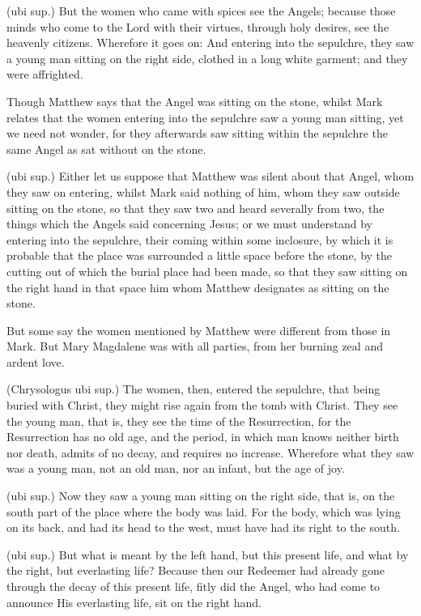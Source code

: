  (ubi sup.) But the women who came with spices see the Angels; because those minds who come to the Lord with their virtues, through holy desires, see the heavenly citizens. Wherefore it goes on: And entering into the sepulchre, they saw a young man sitting on the right side, clothed in a long white garment; and they were affrighted.

 Though Matthew says that the Angel was sitting on the stone, whilst Mark relates that the women entering into the sepulchre saw a young man sitting, yet we need not wonder, for they afterwards saw sitting within the sepulchre the same Angel as sat without on the stone.

 (ubi sup.) Either let us suppose that Matthew was silent about that Angel, whom they saw on entering, whilst Mark said nothing of him, whom they saw outside sitting on the stone, so that they saw two and heard severally from two, the things which the Angels said concerning Jesus; or we must understand by entering into the sepulchre, their coming within some inclosure, by which it is probable that the place was surrounded a little space before the stone, by the cutting out of which the burial place had been made, so that they saw sitting on the right hand in that space him whom Matthew designates as sitting on the stone.

 But some say the women mentioned by Matthew were different from those in Mark. But Mary Magdalene was with all parties, from her burning zeal and ardent love.

 (Chrysologus ubi sup.) The women, then, entered the sepulchre, that being buried with Christ, they might rise again from the tomb with Christ. They see the young man, that is, they see the time of the Resurrection, for the Resurrection has no old age, and the period, in which man knows neither birth nor death, admits of no decay, and requires no increase. Wherefore what they saw was a young man, not an old man, nor an infant, but the age of joy.

 (ubi sup.) Now they saw a young man sitting on the right side, that is, on the south part of the place where the body was laid. For the body, which was lying on its back, and had its head to the west, must have had its right to the south.

 (ubi sup.) But what is meant by the left hand, but this present life, and what by the right, but everlasting life? Because then our Redeemer had already gone through the decay of this present life, fitly did the Angel, who had come to announce His everlasting life, sit on the right hand.

